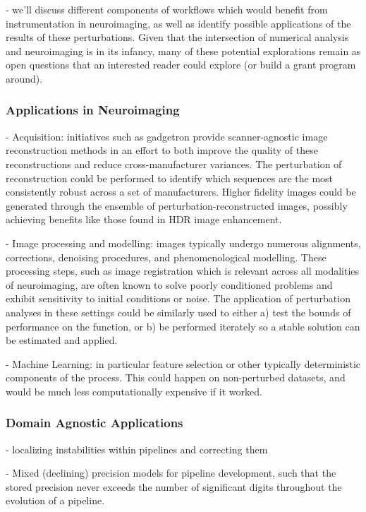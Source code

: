 - we'll discuss different components of workflows which would benefit from instrumentation in neuroimaging, as well
as identify possible applications of the results of these perturbations. Given that the intersection of numerical
analysis and neuroimaging is in its infancy, many of these potential explorations remain as open questions that an
interested reader could explore (or build a grant program around).

\subsubsection{Applications in Neuroimaging}
- Acquisition: initiatives such as gadgetron provide scanner-agnostic image reconstruction methods in an effort to
both improve the quality of these reconstructions and reduce cross-manufacturer variances. The perturbation of
reconstruction could be performed to identify which sequences are the most consistently robust across a set of
manufacturers. Higher fidelity images could be generated through the ensemble of perturbation-reconstructed images,
possibly achieving benefits like those found in HDR image enhancement.

- Image processing and modelling: images typically undergo numerous alignments, corrections, denoising procedures,
and phenomenological modelling. These processing steps, such as image registration which is relevant across all
modalities of neuroimaging, are often known to solve poorly conditioned problems and exhibit sensitivity to initial
conditions or noise. The application of perturbation analyses in these settings could be similarly used to either a)
test the bounds of performance on the function, or b) be performed iterately so a stable solution can be estimated
and applied.

- Machine Learning: in particular feature selection or other typically deterministic components of the process. This
could happen on non-perturbed datasets, and would be much less computationally expensive if it worked.

\subsubsection{Domain Agnostic Applications}
- localizing instabilities within pipelines and correcting them

- Mixed (declining) precision models for pipeline development, such that the stored precision never exceeds the number of
significant digits throughout the evolution of a pipeline.

